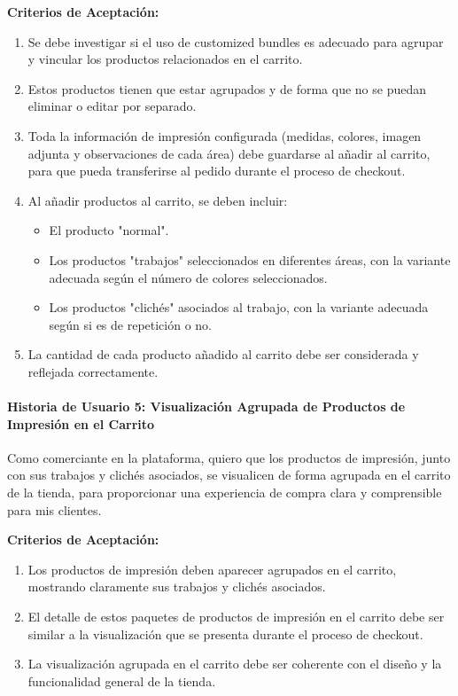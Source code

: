 \documentclass[12pt]{article}
\newcommand{\subsubsubsection}[1]{\paragraph{#1}}
\begin{document}
\vspace{0.5cm}
\textbf{Criterios de Aceptación:}
\begin{enumerate}[label=\arabic*.]
    \item Se debe investigar si el uso de customized bundles es adecuado para agrupar y vincular los productos relacionados en el carrito.
    \item Estos productos tienen que estar agrupados y de forma que no se puedan eliminar o editar por separado.
    \item Toda la información de impresión configurada (medidas, colores, imagen adjunta y observaciones de cada área) debe guardarse al añadir al carrito, para que pueda transferirse al pedido durante el proceso de checkout.
    \item Al añadir productos al carrito, se deben incluir:
          \begin{itemize}
              \item El producto "normal".
              \item Los productos "trabajos" seleccionados en diferentes áreas, con la variante adecuada según el número de colores seleccionados.
              \item Los productos "clichés" asociados al trabajo, con la variante adecuada según si es de repetición o no.
          \end{itemize}
    \item La cantidad de cada producto añadido al carrito debe ser considerada y reflejada correctamente.
\end{enumerate}

\subsubsubsection{Historia de Usuario 5: Visualización Agrupada de Productos de Impresión en el Carrito}\label{sec:historia5}

Como comerciante en la plataforma,
quiero que los productos de impresión, junto con sus trabajos y clichés asociados, se visualicen de forma agrupada en el carrito de la tienda,
para proporcionar una experiencia de compra clara y comprensible para mis clientes.

\vspace{0.5cm}
\textbf{Criterios de Aceptación:}
\begin{enumerate}[label=\arabic*.]
    \item Los productos de impresión deben aparecer agrupados en el carrito, mostrando claramente sus trabajos y clichés asociados.
    \item El detalle de estos paquetes de productos de impresión en el carrito debe ser similar a la visualización que se presenta durante el proceso de checkout.
    \item La visualización agrupada en el carrito debe ser coherente con el diseño y la funcionalidad general de la tienda.
\end{enumerate}
\end{document}
